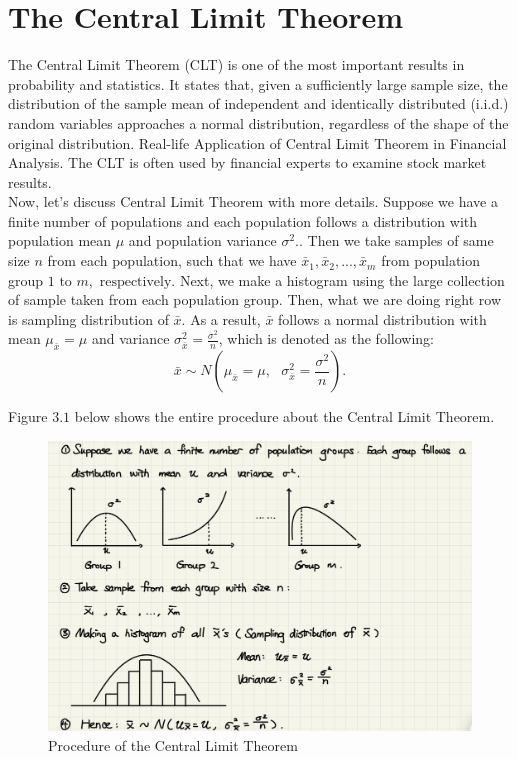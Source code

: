 \chapter{The Central Limit Theorem}

The Central Limit Theorem (CLT) is one of the most important results in probability and statistics. It states that, given a sufficiently large sample size, the distribution of the sample mean of independent and identically distributed (i.i.d.) random variables approaches a normal distribution, regardless of the shape of the original distribution. Real-life Application of Central Limit Theorem in Financial Analysis. The CLT is often used by financial experts to examine stock market results.\\

\noindent
Now, let's discuss Central Limit Theorem with more details. Suppose we have a finite number of populations and each population follows a distribution with population mean $\mu$ and population variance $\sigma^2.$. Then we take samples of same size $n$ from each population, such that we have $\bar{x}_1, \bar{x}_2, ..., \bar{x}_m$ from population group $1 \text{ to } m, \text{ respectively.}$ Next, we make a histogram using the large collection of sample taken from each population group. Then, what we are doing right row is sampling distribution of $\bar{x}$. As a result, $\bar{x}$ follows a normal distribution with mean $\mu_{\bar{x}} = \mu$ and variance $\sigma_{\bar{x}}^{2} = \frac{\sigma^2}{n}$, which is denoted as the following: \[ \bar{x} \sim N(\mu_{\bar{x}} = \mu, \text{ } \sigma_{\bar{x}}^{2} = \frac{\sigma^2}{n}).\]

\noindent
Figure $3.1$ below shows the entire procedure about the Central Limit Theorem. 

\begin{figure}[H]
 \centering
 \includegraphics[scale=0.15]{Section3/Img3/CLT.jpg}
 \caption{Procedure of the Central Limit Theorem}
\end{figure}

